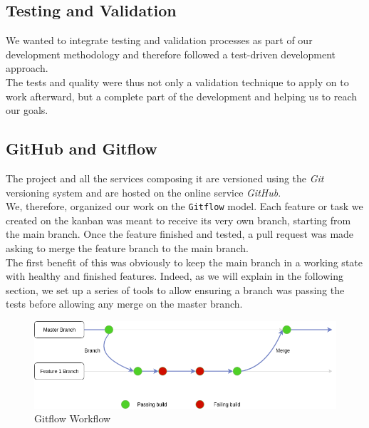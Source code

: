 \documentclass{eplmastersthesis}
\begin{document}
        \subsection{Testing and Validation}

          We wanted to integrate testing and
          validation processes as part of our development methodology and
          therefore followed a test-driven development approach.\\
          The tests and quality were thus not only a validation technique to
          apply on to work afterward, but a complete part of the development
          and helping us to reach our goals.

        \subsection{GitHub and Gitflow}

          The project and all the services composing it are versioned using the
          \textit{Git} versioning system and are hosted on the online service
          \textit{GitHub}.\\
          We, therefore, organized our work on the \texttt{Gitflow} model. Each feature or
          task we created on the kanban was meant to receive its very own
          branch, starting from the main branch.
          Once the feature finished and tested, a pull request was made asking
          to merge the feature branch to the main branch.\\
          The first benefit of this was obviously to keep the main branch in
          a working state with healthy and finished features. Indeed, as
          we will explain in the following section, we set up a series of tools
          to allow ensuring a branch was passing the tests before allowing any
          merge on the master branch.\\

          \begin{figure}[H]
            \centering
            \includegraphics[scale=0.6]{figures/gitflow.png}
            \caption{\label{gitworkflow} Gitflow Workflow}
          \end{figure}
\end{document}
